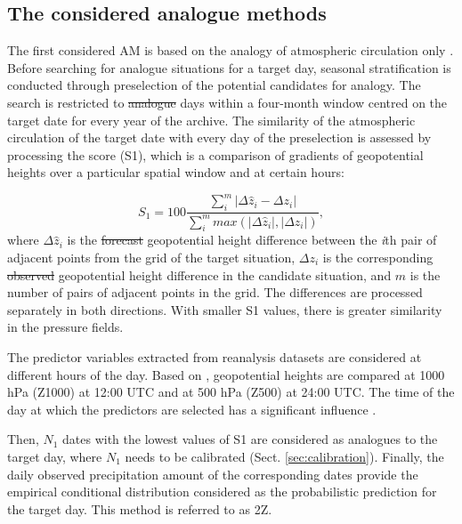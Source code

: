 \documentclass[hess, manuscript]{copernicus}
\providecommand{\DIFadd}[1]{{\protect\color{blue}\uwave{#1}}} %
\providecommand{\DIFdel}[1]{{\protect\color{red}\sout{#1}}}                      %
\providecommand{\DIFaddbegin}{} %
\providecommand{\DIFaddend}{} %
\providecommand{\DIFdelbegin}{} %
\providecommand{\DIFdelend}{} %
\begin{document}
	\subsection{The considered analogue methods}
	\label{sec:analog_method}

	The first considered AM is based on the analogy of atmospheric circulation only \citep[Table \ref{table:method_2Z};][]{Obled2002, Bontron2005}. Before searching for analogue situations for a target day, seasonal stratification is conducted through preselection of the potential candidates for analogy. The search is restricted to \DIFdelbegin \DIFdel{analogue }\DIFdelend days within a four-month window centred on the target date for every year of the archive. The similarity of the atmospheric circulation of the target date with every day of the preselection is assessed by processing the \citet{Teweles1954} score (S1), which is a comparison of gradients of geopotential heights over a particular spatial window and at certain hours:

	\begin{equation}
	\label{eq:S1}
	S_{1}=100 \frac {\displaystyle \sum_{i}^{m} \vert \Delta\hat{z}_{i} - \Delta z_{i} \vert}
	{\displaystyle \sum_{i}^{m} max( \vert \Delta\hat{z}_{i} \vert , \vert \Delta z_{i} \vert ) } ,
	\end{equation}
	where $\Delta \hat{z}_{i}$ is the \DIFdelbegin \DIFdel{forecast }\DIFdelend geopotential height difference between the \textit{i}th pair of adjacent points from the grid of the target situation, $\Delta z_{i}$ is the corresponding \DIFdelbegin \DIFdel{observed }\DIFdelend geopotential height difference in the candidate situation, and $m$ is the number of pairs of adjacent points in the grid. The differences are processed separately in both directions. With smaller S1 values, there is greater similarity in the pressure fields.

	The predictor variables extracted from reanalysis datasets are considered at different hours of the day. Based on \citet{Bontron2005}, geopotential heights are compared at 1000 hPa (Z1000) at 12:00 \DIFaddbegin \DIFadd{h }\DIFaddend UTC and at 500 hPa (Z500) at 24:00 \DIFaddbegin \DIFadd{h }\DIFaddend UTC. The time of the day at which the predictors are selected has a significant influence \citep{Bontron2004}.

	Then, $N_{1}$ dates with the lowest values of S1 are considered as analogues to the target day, where $N_{1}$ needs to be calibrated (Sect. \ref{sec:calibration}). Finally, the daily observed precipitation amount of the corresponding dates provide the empirical conditional distribution considered as the probabilistic prediction for the target day. This method \DIFaddbegin \DIFadd{based on two geopotential height fields }\DIFaddend is referred to as 2Z.
\end{document}
